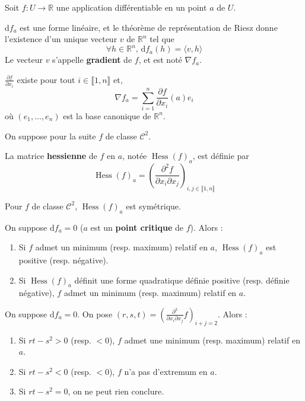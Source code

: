	Soit $f : U \rightarrow \mathbb{R}$ une application différentiable en un point $a$ de $U$.

	\begin{definition}
		$\mathrm{d}f_a$ est une forme linéaire, et le théorème de représentation de Riesz donne l'existence d'un unique vecteur $v$ de $\mathbb{R}^n$ tel que
		\[ \forall h \in \mathbb{R}^n, \, \mathrm{d}f_a(h) = \langle v, h \rangle \]
		Le vecteur $v$ s'appelle \textbf{gradient} de $f$, et est noté $\nabla f_a$.
	\end{definition}

	\begin{proposition}
		$\frac{\partial f}{\partial x_i}$ existe pour tout $i \in \llbracket 1, n \rrbracket$ et,
		\[ \nabla f_a = \sum_{i=1}^n \frac{\partial f}{\partial x_i}(a) e_i \]
		où $(e_1, \dots, e_n)$ est la base canonique de $\mathbb{R}^n$.
	\end{proposition}


	On suppose pour la suite $f$ de classe $\mathcal{C}^2$.

	\begin{definition}
		La matrice \textbf{hessienne} de $f$ en $a$, notée $\operatorname{Hess}(f)_a$, est définie par
		\[ \operatorname{Hess}(f)_a = \left( \frac{\partial^2 f}{\partial x_i \partial x_j} \right)_{i,j \in \llbracket 1, n \rrbracket} \]
	\end{definition}

	\begin{remark}
		Pour $f$ de classe $\mathcal{C}^2$, $\operatorname{Hess}(f)_a$ est symétrique.
	\end{remark}

	\begin{theorem}
		On suppose $\mathrm{d}f_a = 0$ ($a$ est un \textbf{point critique} de $f$). Alors :
		\begin{enumerate}[label=(\roman*)]
			\item Si $f$ admet un minimum (resp. maximum) relatif en $a$, $\operatorname{Hess}(f)_a$ est positive (resp. négative).
			\item Si $\operatorname{Hess}(f)_a$ définit une forme quadratique définie positive (resp. définie négative), $f$ admet un minimum (resp. maximum) relatif en $a$.
		\end{enumerate}
	\end{theorem}

	\begin{example}
		On suppose $\mathrm{d}f_a = 0$. On pose $(r,s,t) = \left(  \frac{\partial^2}{\partial x_i \partial x_j} f \right)_{i+j=2}$. Alors :
		\begin{enumerate}[label=(\roman*)]
			\item Si $rt-s^2 > 0$ (resp. $< 0$), $f$ admet une minimum (resp. maximum) relatif en $a$.
			\item Si $rt-s^2 < 0$ (resp. $< 0$), $f$ n'a pas d'extremum en $a$.
			\item Si $rt-s^2 = 0$, on ne peut rien conclure.
		\end{enumerate}
	\end{example}

